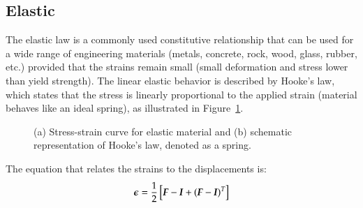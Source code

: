 \subsection{Elastic}
The elastic law is a commonly used constitutive relationship that can be used
for a wide range of engineering materials (\eg metals, concrete, rock, wood,
glass, rubber, etc.) provided that the strains remain small (\ie small
deformation and stress lower than yield strength). The linear elastic behavior
is described by Hooke's law, which states that the stress is linearly
proportional to the applied strain (material behaves like an ideal spring), as
illustrated in Figure~\ref{fig:smm:cl:elastic}.
\begin{figure}[!htb]
  \begin{center}

    \hspace{0.05\textwidth}
    \caption{(a) Stress-strain curve for elastic material and (b) schematic representation of Hooke's law, denoted as a spring.}
    \label{fig:smm:cl:elastic}
  \end{center}
\end{figure}
The equation that relates the strains to the displacements is:
\begin{equation}\label{eqn:smm:strain_inf}
  \boldsymbol{\epsilon} = \frac{1}{2} \left[ \boldsymbol{F}-\boldsymbol{I}+(\boldsymbol{F}-\boldsymbol{I})^T \right]
\end{equation}
